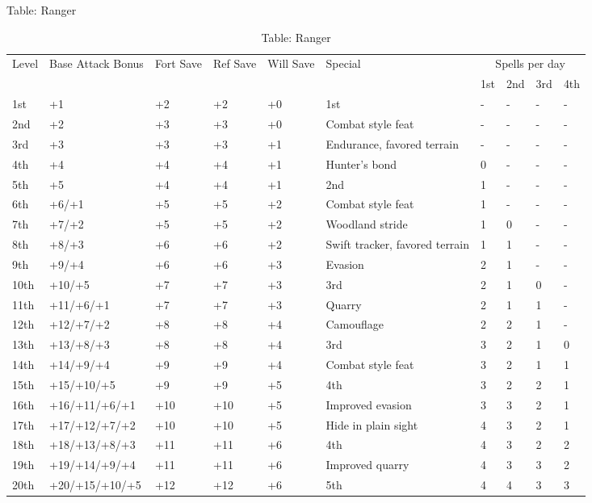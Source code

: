 Table: Ranger
\begin{table}[]
\sffamily
\caption{Table: Ranger}
\begin{tabularx}{\linewidth}{lllllXllll}
\multirow{2}{*}{Level} & \multirow{2}{*}{\parbox{5em}{Base Attack Bonus}} & \multirow{2}{*}{\parbox{1.5em}{Fort Save}} & \multirow{2}{*}{\parbox{1.5em}{Ref Save}} & \multirow{2}{*}{\parbox{1.5em}{Will Save}} & \multirow{2}{*}{Special}  & \multicolumn{4}{c}{Spells per day} \\
                       &                                    &                            &                           &                            &                                                                        & 1st  & 2nd & 3rd & 4th \\
\hline
1st & +1 & +2 & +2 & +0 & 1st  & - & - & - & -\\
2nd & +2 & +3 & +3 & +0 & Combat style feat & - & - & - & -\\
3rd & +3 & +3 & +3 & +1 & Endurance, favored terrain & - & - & - & -\\
4th & +4 & +4 & +4 & +1 & Hunter's bond & 0 & - & - & -\\
5th & +5 & +4 & +4 & +1 & 2nd  & 1 & - & - & -\\
6th & +6/+1 & +5 & +5 & +2 & Combat style feat & 1 & - & - & -\\
7th & +7/+2 & +5 & +5 & +2 & Woodland stride & 1 & 0 & - & -\\
8th & +8/+3 & +6 & +6 & +2 & Swift tracker, favored terrain & 1 & 1 & - & -\\
9th & +9/+4 & +6 & +6 & +3 & Evasion & 2 & 1 & - & -\\
10th & +10/+5 & +7 & +7 & +3 & 3rd  & 2 & 1 & 0 & -\\
11th & +11/+6/+1 & +7 & +7 & +3 & Quarry & 2 & 1 & 1 & -\\
12th & +12/+7/+2 & +8 & +8 & +4 & Camouflage & 2 & 2 & 1 & -\\
13th & +13/+8/+3 & +8 & +8 & +4 & 3rd  & 3 & 2 & 1 & 0\\
14th & +14/+9/+4 & +9 & +9 & +4 & Combat style feat & 3 & 2 & 1 & 1\\
15th & +15/+10/+5 & +9 & +9 & +5 & 4th  & 3 & 2 & 2 & 1\\
16th & +16/+11/+6/+1 & +10 & +10 & +5 & Improved evasion & 3 & 3 & 2 & 1\\
17th & +17/+12/+7/+2 & +10 & +10 & +5 & Hide in plain sight & 4 & 3 & 2 & 1\\
18th & +18/+13/+8/+3 & +11 & +11 & +6 & 4th  & 4 & 3 & 2 & 2\\
19th & +19/+14/+9/+4 & +11 & +11 & +6 & Improved quarry & 4 & 3 & 3 & 2\\
20th & +20/+15/+10/+5 & +12 & +12 & +6 & 5th  & 4 & 4 & 3 & 3\\
\end{tabularx}
\end{table}

